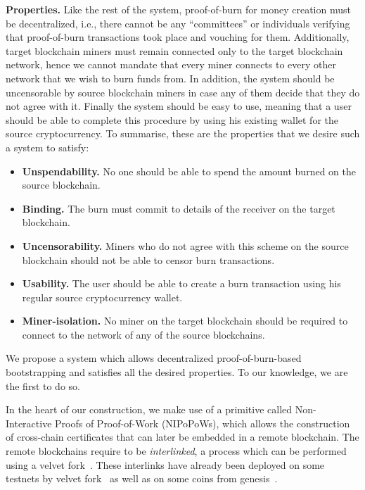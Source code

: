 \noindent
\textbf{Properties.}
Like the rest of the system, proof-of-burn for money creation must be decentralized, i.e., there cannot be any ``committees'' or individuals verifying that proof-of-burn transactions took place and vouching for them. Additionally, target blockchain miners must remain connected only to the target blockchain network, hence we cannot mandate that every miner connects to every other network that we wish to burn funds from. In addition, the system should be uncensorable by source blockchain miners in case any of them decide that they do not agree with it. Finally the system should be easy to use, meaning that a user should be able to complete this procedure by using his existing wallet for the source cryptocurrency. To summarise, these are the properties that we desire such a system to satisfy:

\begin{itemize}
    \item \textbf{Unspendability.} No one should be able to spend the amount burned on the source blockchain.
    \item \textbf{Binding.} The burn must commit to details of the receiver on the target blockchain.
    \item \textbf{Uncensorability.} Miners who do not agree with this scheme on the source blockchain should not be able to censor burn transactions.
    \item \textbf{Usability.} The user should be able to create a burn transaction using his regular source cryptocurrency wallet.
    \item \textbf{Miner-isolation.} No miner on the target blockchain should be required to connect to the network of any of the source blockchains.
\end{itemize}

We propose a system which allows decentralized proof-of-burn-based bootstrapping and satisfies all the desired properties. To our knowledge, we are the first to do so.

In the heart of our construction, we make use of a primitive called
Non-Interactive Proofs of Proof-of-Work (NIPoPoWs), which allows the
construction of cross-chain certificates that can later be embedded in a remote
blockchain. The remote blockchains require to be \emph{interlinked}, a process
which can be performed using a velvet fork~\cite{velvet}. These interlinks have
already been deployed on some testnets by velvet fork~\cite{gtklocker} as well
as on some coins from genesis~\cite{ergo}.

